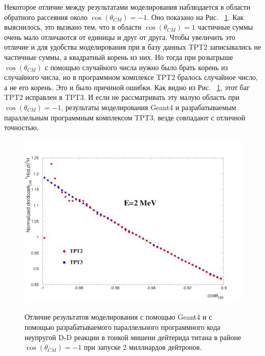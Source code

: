 \documentclass[a4paper,12pt]{article}
\begin{document}
\begin{large}
	Некоторое отличие между результатами моделирования наблюдается в области обратного рассеяния около    $\cos{ \left( \theta_{CM} \right) }=-1$.
	Оно показано на Рис. ~\ref{fig:CompareTPT2WithTPT32billionParticles}.
	Как выяснилось, это вызвано тем, что в области $\cos{ \left( \theta_{CM} \right) }=1$ частичные суммы очень мало отличаются от единицы и друг от друга.
	Чтобы увеличить это отличие и для удобства моделирования при в базу данных TPT2 записывались не частичные суммы, а квадратный корень из них.
	Но тогда при розыгрыше $\cos{ \left( \theta_{CM} \right) }$ с помощью случайного числа нужно было брать корень из случайного числа, но в программном комплексе TPT2 бралось случайное число, а не его корень. Это и было причиной ошибки.
	Как видно из Рис. ~\ref{fig:CompareTPT2WithTPT32billionParticles}, этот баг TPT2 исправлен в TPT3. 		И если не рассматривать эту малую область при $\cos{ \left( \theta_{CM} \right) }=-1$, результаты моделирования Geant4 и разрабатываемым параллельным программным комплексом TPT3, везде совпадают с отличной точностью.
	
\begin{figure}[ht]
  {
     \includegraphics[width=0.99\linewidth]{images/compare_tpt2_with_tpt3_2billion.pdf}
  }
  \caption{Отличие результатов моделирования с помощью Geant4 и с помощью разрабатываемого параллельного программного кода неупругой D-D реакции в тонкой мишени дейтерида титана в районе $\cos{ \left( \theta_{CM} \right) }=-1$ при запуске 2 миллиардов дейтронов.}
  \label{fig:CompareTPT2WithTPT32billionParticles}
\end{figure}	
	

\clearpage{}

\end{large}
\end{document}
